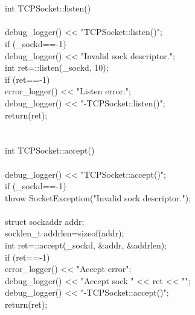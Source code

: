 \documentclass{article}
\begin{document}
\\
 
\\
 int TCPSocket::listen()
\\
 {
\\
     debug_logger() << "TCPSocket::listen()\n";
\\
     if (_sockd==-1)
\\
         debug_logger() << "Invalid sock descriptor.\n";
\\
     int ret=::listen(_sockd, 10);
\\
         if (ret==-1)
\\
                 error_logger() << "Listen error.\n";
\\
     debug_logger() << "-TCPSocket::listen()\n";
\\
         return(ret);
\\
 }
\\
 
\\
 int TCPSocket::accept()
\\
 {
\\
     debug_logger() << "TCPSocket::accept()\n";
\\
     if (_sockd==-1) {
\\
         throw SocketException("Invalid sock descriptor.");
\\
     }
\\
     struct sockaddr addr;
\\
     socklen_t addrlen=sizeof(addr);
\\
     int ret=::accept(_sockd, &addr, &addrlen);
\\
         if (ret==-1)
\\
                 error_logger() << "Accept error\n";
\\
     debug_logger() << "Accept sock " << ret << "\n";
\\
     debug_logger() << "-TCPSocket::accept()\n";
\\
     return(ret);
\\
 }
\\
 
\\
\end{document}
